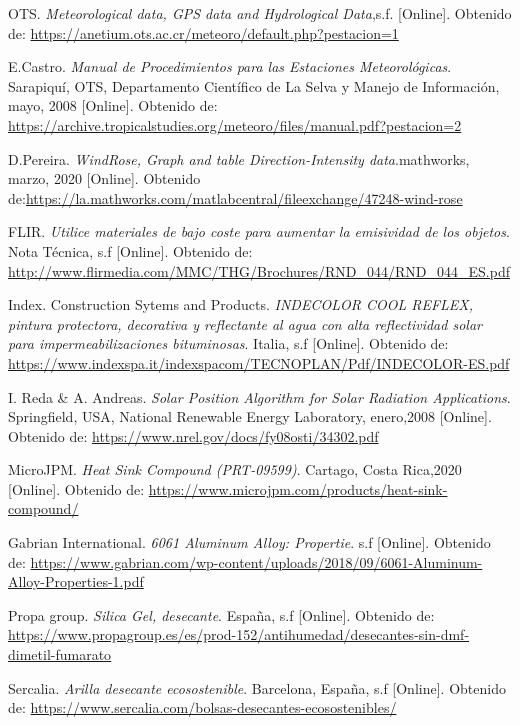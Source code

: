 \documentclass[notitlepage,oneside]{book}
\begin{document}
\begin{thebibliography}{99}
OTS. \emph {Meteorological data, GPS data and Hydrological Data},s.f. [Online]. Obtenido de: \url{https://anetium.ots.ac.cr/meteoro/default.php?pestacion=1}

E.Castro. \emph {Manual de Procedimientos para las Estaciones Meteorológicas}. Sarapiquí, OTS, Departamento Científico de La Selva y Manejo de Información, mayo, 2008 [Online]. Obtenido de: \url{ https://archive.tropicalstudies.org/meteoro/files/manual.pdf?pestacion=2}

D.Pereira. \emph {WindRose, Graph and table Direction-Intensity data}.mathworks, marzo, 2020 [Online]. Obtenido de:\url{https://la.mathworks.com/matlabcentral/fileexchange/47248-wind-rose}

FLIR. \emph {Utilice materiales de bajo coste para aumentar la emisividad de los objetos}. Nota Técnica, s.f [Online]. Obtenido de: \url{http://www.flirmedia.com/MMC/THG/Brochures/RND_044/RND_044_ES.pdf}

Index. Construction Sytems and Products. \emph {INDECOLOR COOL REFLEX, pintura protectora, decorativa y reflectante al agua con alta reflectividad solar para impermeabilizaciones bituminosas}. Italia, s.f [Online]. Obtenido de: \url{https://www.indexspa.it/indexspacom/TECNOPLAN/Pdf/INDECOLOR-ES.pdf}

I. Reda \& A. Andreas. \emph {Solar Position Algorithm for Solar Radiation Applications}. Springfield, USA, National Renewable Energy Laboratory, enero,2008 [Online]. Obtenido de: \url{https://www.nrel.gov/docs/fy08osti/34302.pdf}

MicroJPM. \emph {Heat Sink Compound (PRT-09599)}. Cartago, Costa Rica,2020 [Online]. Obtenido de: \url{https://www.microjpm.com/products/heat-sink-compound/}

Gabrian International. \emph {6061 Aluminum Alloy: Propertie}. s.f [Online]. Obtenido de: \url{https://www.gabrian.com/wp-content/uploads/2018/09/6061-Aluminum-Alloy-Properties-1.pdf}

Propa group. \emph {Silica Gel, desecante}. España, s.f [Online]. Obtenido de: \url{https://www.propagroup.es/es/prod-152/antihumedad/desecantes-sin-dmf-dimetil-fumarato}

Sercalia. \emph {Arilla desecante ecosostenible}. Barcelona, España,  s.f [Online]. Obtenido de: \url{https://www.sercalia.com/bolsas-desecantes-ecosostenibles/}

\end{thebibliography}
\end{document}
